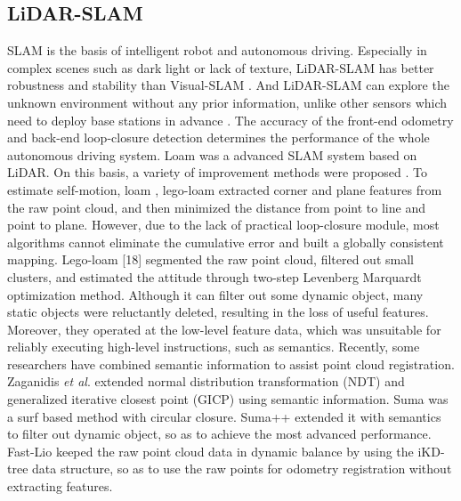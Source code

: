 \documentclass[lettersize,journal]{IEEEtran}
\begin{document}
\subsection{LiDAR-SLAM}

SLAM is the basis of intelligent robot and autonomous driving. Especially in complex scenes such as dark light or lack of texture, LiDAR-SLAM has better robustness and stability than Visual-SLAM \cite{huai2021consistent, chou2021efficient}. And LiDAR-SLAM can explore the unknown environment without any prior information, unlike other sensors which need to deploy base stations in advance \cite{cao2021universal,xu2021distributed}. The accuracy of the front-end odometry and back-end loop-closure detection determines the performance of the whole autonomous driving system. Loam \cite{zhang2014loam} was a advanced SLAM system based on LiDAR. On this basis, a variety of improvement methods were proposed \cite{shan2018lego, chen2020sloam, zhang2015visual, wu2020robust}. To estimate self-motion, loam \cite{zhang2014loam}, lego-loam \cite{shan2018lego} extracted corner and plane features from the raw point cloud, and then minimized the distance from point to line and point to plane. However, due to the lack of practical loop-closure module, most algorithms cannot eliminate the cumulative error and built a globally consistent mapping. Lego-loam [18] segmented the raw point cloud, filtered out small clusters, and estimated the attitude through two-step Levenberg Marquardt optimization method. Although it can filter out some dynamic object, many static objects were reluctantly deleted, resulting in the loss of useful features. Moreover, they operated at the low-level feature data, which was unsuitable for reliably executing high-level instructions, such as semantics. Recently, some researchers have combined semantic information to assist point cloud registration. Zaganidis \emph{et al}. \cite{zaganidis2018integrating} extended normal distribution transformation (NDT)  \cite{biber2003normal} and generalized iterative closest point (GICP) \cite{segal2009generalized} using semantic information. Suma \cite{bai2019simgnn} was a surf based method with circular closure. Suma++ \cite{chen2019suma++} extended it with semantics to filter out dynamic object, so as to achieve the most advanced performance. Fast-Lio \cite{xu2021fast} keeped the raw point cloud data in dynamic balance by using the iKD-tree \cite{cai2021ikd} data structure, so as to use the raw points for odometry registration without extracting features.
\end{document}
